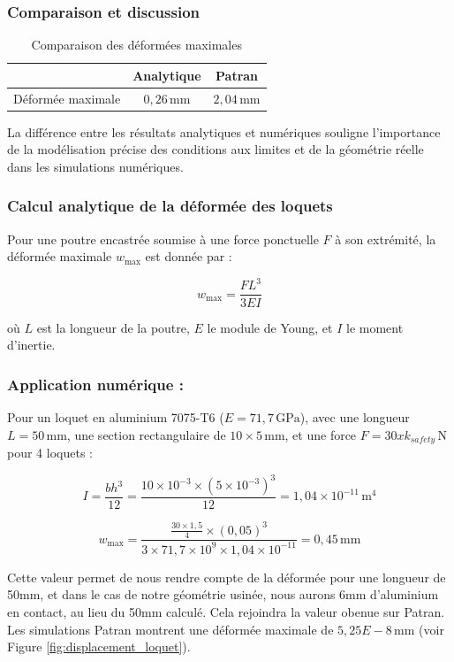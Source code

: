 \subsubsection{Comparaison et discussion}

\begin{table}[h!]
    \centering
    \caption{Comparaison des déformées maximales}
    \begin{tabular}{|c|c|c|}
    \hline
    & \textbf{Analytique} & \textbf{Patran} \\
    \hline
    Déformée maximale & \(0,26 \, \text{mm}\) & \(2,04 \, \text{mm}\) \\
    \hline
    \end{tabular}
    \label{tab:deformee_comparaison}
\end{table}

La différence entre les résultats analytiques et numériques souligne l'importance de la modélisation précise des conditions aux limites et de la géométrie réelle dans les simulations numériques.


\subsubsection{Calcul analytique de la déformée des loquets}

Pour une poutre encastrée soumise à une force ponctuelle \(F\) à son extrémité, la déformée maximale \(w_{\text{max}}\) est donnée par :

\[
w_{\text{max}} = \frac{F L^3}{3 E I}
\]

où \(L\) est la longueur de la poutre, \(E\) le module de Young, et \(I\) le moment d'inertie.

\subsubsection*{Application numérique :}
Pour un loquet en aluminium 7075-T6 (\(E = 71,7 \, \text{GPa}\)), avec une longueur \(L = 50 \, \text{mm}\), une section rectangulaire de \(10 \times 5 \, \text{mm}\), et une force \(F = 30xk_{safety} \, \text{N}\) pour 4 loquets :

\[
I = \frac{b h^3}{12} = \frac{10 \times 10^{-3} \times (5 \times 10^{-3})^3}{12} = 1,04 \times 10^{-11} \, \text{m}^4
\]

\[
w_{\text{max}} = \frac{\frac{30\times 1,5}{4} \times (0,05)^3}{3 \times 71,7 \times 10^9 \times 1,04 \times 10^{-11}} = 0,45 \, \text{mm}
\]

Cette valeur permet de nous rendre compte de la déformée pour une longueur de 50mm, et dans le cas de notre géométrie usinée, nous aurons 6mm d'aluminium en contact, au lieu du 50mm calculé. Cela rejoindra la valeur obenue sur Patran.
Les simulations Patran montrent une déformée maximale de \(5,25E-8 \, \text{mm}\) (voir Figure \ref{fig:displacement_loquet}).

\newpage
